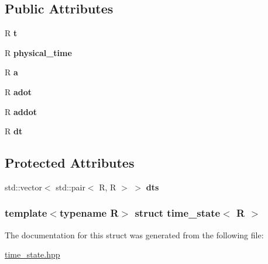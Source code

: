 \subsection*{Public Attributes}
\begin{DoxyCompactItemize}
\item 
\hypertarget{structtime__state_abe9f5681bd175cf2c95846cd9242714f}{
R {\bfseries t}}
\label{structtime__state_abe9f5681bd175cf2c95846cd9242714f}

\item 
\hypertarget{structtime__state_aaa3077dc17a2e26b3df614c4731ec79e}{
R {\bfseries physical\_\-time}}
\label{structtime__state_aaa3077dc17a2e26b3df614c4731ec79e}

\item 
\hypertarget{structtime__state_afc42049df8fd72572900865bcd94d482}{
R {\bfseries a}}
\label{structtime__state_afc42049df8fd72572900865bcd94d482}

\item 
\hypertarget{structtime__state_ab97eafb749b43fae8f4f14b14f48369c}{
R {\bfseries adot}}
\label{structtime__state_ab97eafb749b43fae8f4f14b14f48369c}

\item 
\hypertarget{structtime__state_a67f019bfc07228a17c6458a2ab378668}{
R {\bfseries addot}}
\label{structtime__state_a67f019bfc07228a17c6458a2ab378668}

\item 
\hypertarget{structtime__state_a218510dd06e5bb674159c65944302034}{
R {\bfseries dt}}
\label{structtime__state_a218510dd06e5bb674159c65944302034}

\end{DoxyCompactItemize}
\subsection*{Protected Attributes}
\begin{DoxyCompactItemize}
\item 
\hypertarget{structtime__state_af57df836c7fff8d2b56f5b491ff3b1bb}{
std::vector$<$ std::pair$<$ R, R $>$ $>$ {\bfseries dts}}
\label{structtime__state_af57df836c7fff8d2b56f5b491ff3b1bb}

\end{DoxyCompactItemize}
\subsubsection*{template$<$typename R$>$ struct time\_\-state$<$ R $>$}



The documentation for this struct was generated from the following file:\begin{DoxyCompactItemize}
\item 
\hyperlink{time__state_8hpp}{time\_\-state.hpp}\end{DoxyCompactItemize}
